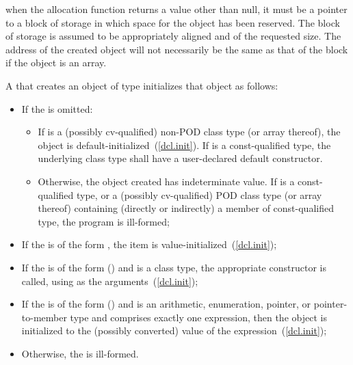 \pnum
\enternote 
when the allocation function returns a value other than null, it must be
a pointer to a block of storage in which space for the object has been
reserved. The block of storage is assumed to be appropriately aligned
and of the requested size. The address of the created object will not
necessarily be the same as that of the block if the object is an array.
\exitnote 

\pnum
{}%
%
%
%
%
%
%
A  that creates an object of type 
initializes that object as follows:

\begin{itemize}
\item If the  is omitted:

\begin{itemize}
\item If  is a (possibly cv-qualified) non-POD class type (or
array thereof), the object is
default-initialized~(\ref{dcl.init}). If  is a const-qualified
type, the underlying class type shall have a user-declared default
constructor.
\item Otherwise, the object created has indeterminate value. If 
is a const-qualified type, or a (possibly cv-qualified) POD class type
(or array thereof) containing (directly or indirectly) a member of
const-qualified type, the program is ill-formed;
\end{itemize}

\item If the  is of the form \tcode{()}, the
item is value-initialized~(\ref{dcl.init});

\item If the  is of the form
() and  is a class type, the
appropriate constructor is called, using  as
the arguments~(\ref{dcl.init});

\item If the  is of the form
() and  is an arithmetic, enumeration,
pointer, or pointer-to-member type and 
comprises exactly one expression, then the object is initialized to the
(possibly converted) value of the expression~(\ref{dcl.init});

\item Otherwise, the  is ill-formed.
\end{itemize}

